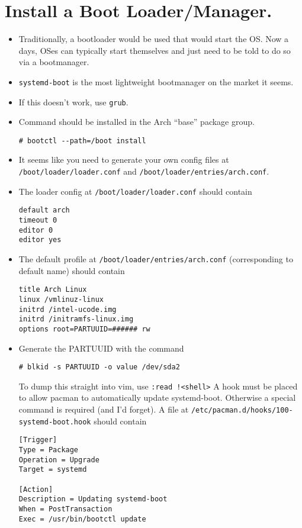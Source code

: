\documentclass{article}
\begin{document}
\section{Install a Boot Loader/Manager.}
  \begin{itemize}
    \item Traditionally, a bootloader would be used that would start the OS. Now
      a days, OSes can typically start themselves and just need to be told to do
      so via a bootmanager.
    \item \verb|systemd-boot| is the most lightweight bootmanager on the
      market it seems.
    \item If this doesn't work, use \verb|grub|.
    \item Command should be installed in the Arch ``base'' package group.
\begin{verbatim}
# bootctl --path=/boot install
\end{verbatim}
    \item It seems like you need to generate your own config files at
      \verb|/boot/loader/loader.conf| and
        \verb|/boot/loader/entries/arch.conf|.
    \item The loader config at \verb|/boot/loader/loader.conf| should contain
\begin{verbatim}
default arch
timeout 0
editor 0
editor yes
\end{verbatim}
    \item The default profile at \verb|/boot/loader/entries/arch.conf|
      (corresponding to default name) should contain
\begin{verbatim}
title Arch Linux
linux /vmlinuz-linux
initrd /intel-ucode.img
initrd /initramfs-linux.img
options root=PARTUUID=###### rw
\end{verbatim}
    \item Generate the PARTUUID with the command
\begin{verbatim}
# blkid -s PARTUUID -o value /dev/sda2
\end{verbatim}
      To dump this straight into vim, use
      \verb|:read !<shell>| A hook must be placed
      to allow pacman to automatically update systemd-boot. Otherwise a
      special command is required (and I'd forget). A file at
      \verb|/etc/pacman.d/hooks/100-systemd-boot.hook| should contain
\begin{verbatim}
[Trigger]
Type = Package
Operation = Upgrade
Target = systemd

[Action]
Description = Updating systemd-boot
When = PostTransaction
Exec = /usr/bin/bootctl update
\end{verbatim}
  \end{itemize}
\end{document}

